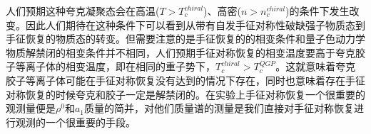 人们预期这种夸克凝聚态会在高温($T > T_c^{chiral}$)、高密($n > n_c^{chiral}$)的条件下发生改变。因此人们期待在这种条件下可以看到从带有自发手征对称性破缺强子物质态到手征恢复的物质态的转变。但需要注意的是手征恢复的的相变条件和量子色动力学物质解禁闭的相变条件并不相同，人们预期手征对称恢复的相变温度要高于夸克胶子等离子体的相变温度，即在相同的重子势下，$T_c^{chiral} > T_c^{QGP}$。这就意味着夸克胶子等离子体可能在手征对称恢复没有达到的情况下存在，同时也意味着存在手征对称恢复的时候夸克和胶子一定是解禁闭的。在实验上手征对称恢复一个很重要的观测量便是$\rho^0$和$a_1$质量的简并，对他们质量谱的测量是我们直接对手征对称恢复进行观测的一个很重要的手段。
